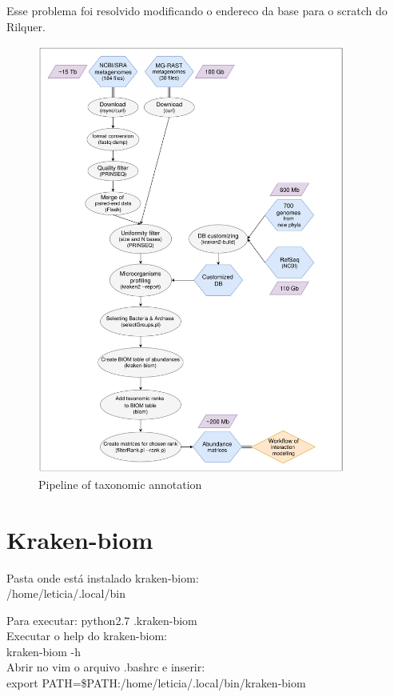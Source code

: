 \documentclass[12pt, a4paper]{report}
\begin{document}
Esse problema foi resolvido modificando o endereco da base para o scratch do Rilquer.

\begin{figure}
  \centering 
  \includegraphics[width=0.9\textwidth]{figures/workflow-aquifers-reviewed_03-09-18.pdf}
  \caption{Pipeline of taxonomic annotation}
  \label{texworks} 
  \end{figure}

\section{Kraken-biom}
Pasta onde está instalado kraken-biom: \\
/home/leticia/.local/bin

Para executar:
python2.7 .\/kraken-biom \\

Executar o help do kraken-biom: \\
kraken-biom -h \\

Abrir no vim o arquivo .bashrc e inserir: \\
export PATH=\$PATH:/home/leticia/.local/bin/kraken-biom \\
\end{document}
